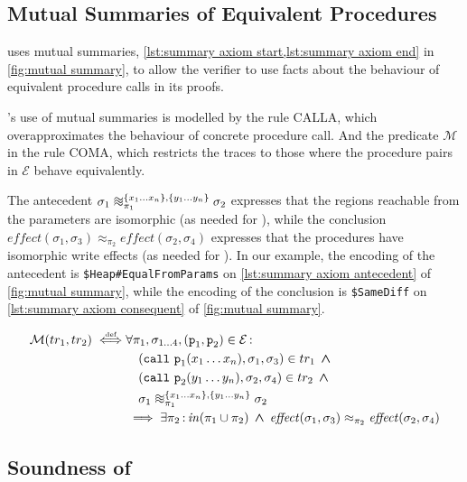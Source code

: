 \documentclass[runningheads,a4paper]{llncs}
\DeclareMathOperator{\band}{\bm{\;\land\;}}
\DeclareMathOperator{\suchthat}{:}
\newcommand*{\qvars}[2]{#1_{#2}}
\newcommand*{\defiff}{\stackrel{\text{\tiny def}}{\iff}}
\newcommand{\tr}{tr}
\newcommand*\iso{\approx}
\newcommand*{\equivmap}{\mathcal{E}}
\newcommand*{\callRuleAbstract}{\textnormal{CALLA}}
\newcommand*{\composeRuleAbstract}{\textnormal{COMA}}
\newcommand{\diff}{\mathit{effect}}
\newcommand*{\call}{\mathtt{call}}
\newcommand*{\fun}{\texttt{p}}
\newcommand*{\bijection}[1]{\mathit{in}{\left(#1\right)}}
\newcommand*{\wiso}{%
  \mathrel{\vcenter{\offinterlineskip
  \hbox{$\sim$}\vskip-.35ex\hbox{$\sim$}\vskip-.35ex\hbox{$\sim$}}}}
\newcommand*{\mutR}{\mathcal{M}}
\newcommand*{\store}{\sigma}
\begin{document}
\subsection{Mutual Summaries of Equivalent Procedures}

\tool{} uses mutual summaries, \cref{lst:summary axiom start,lst:summary axiom end} in \cref{fig:mutual summary}, to allow the verifier to use facts about the behaviour of equivalent procedure calls in its proofs.

\tool{}'s use of mutual summaries is modelled by the rule \callRuleAbstract{}, which overapproximates the behaviour of concrete procedure call. And the predicate $\mutR$ in the rule \composeRuleAbstract{}, which restricts the traces to those where the procedure pairs in $\equivmap$ behave equivalently.

The antecedent $\store_1 \wiso_{\pi_1}^{\{x_1 \ldots x_n\},\{y_1 \ldots y_n\}} \store_2$ expresses that the regions reachable from the parameters are isomorphic (as needed for \ctwo{}), while the conclusion $\diff(\store_1,\store_3) \iso_{\pi_2} \diff(\store_2,\store_4)$ expresses that the procedures have isomorphic write effects (as needed for \cthree{}). In our example, the encoding of the antecedent is \texttt{\$Heap\#EqualFromParams} on \cref{lst:summary axiom antecedent} of \cref{fig:mutual summary}, while the encoding of the conclusion is \texttt{\$SameDiff} on \cref{lst:summary axiom consequent} of \cref{fig:mutual summary}.

\begin{definition}\label{def:mutual summary}\setlength{\parindent}{0cm}
\[\begin{aligned}
\mutR(\tr_1,\tr_2) \defiff
&\forall \pi_1,\qvars{\store}{1 \ldots 4},(\fun_1,\fun_2) \in \equivmap \suchthat \\
&\quad		(\call~\fun_1(x_1 \ldots x_n),\store_1,\store_3) \in \tr_1 \band \\
&\quad		(\call~\fun_2(y_1 \ldots y_n),\store_2,\store_4) \in \tr_2 \band \\
&\quad		\store_1 \wiso_{\pi_1}^{\{x_1 \ldots x_n\},\{y_1 \ldots y_n\}} \store_2 \\
&	\implies
 	\exists \pi_2 \suchthat \bijection{\pi_1 \cup \pi_2} \band \diff(\store_1,\store_3) \iso_{\pi_2} \diff(\store_2,\store_4)
\end{aligned}\]
\end{definition}

\subsection{Soundness of \metho{}}
\end{document}
